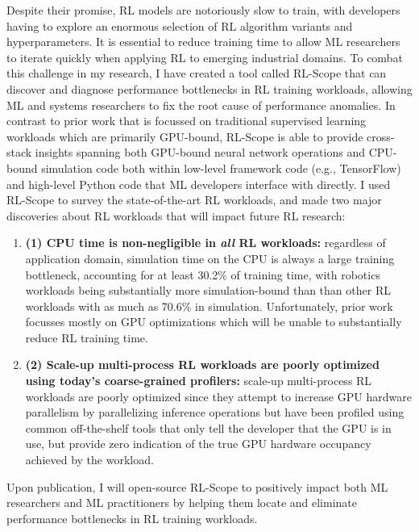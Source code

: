 \documentclass[letterpaper,11pt]{article}
\begin{document}
Despite their promise, RL models are notoriously slow to train, with developers having to explore an enormous selection of RL algorithm variants and hyperparameters.  It is essential to reduce training time to allow ML researchers to iterate quickly when applying RL to emerging industrial domains.  To combat this challenge in my research, I have created a tool called RL-Scope that can discover and diagnose performance bottlenecks in RL training workloads, allowing ML and systems researchers to fix the root cause of performance anomalies.
%
In contrast to prior work that is focussed on traditional supervised learning workloads which are primarily GPU-bound, RL-Scope is able to provide cross-stack insights spanning both GPU-bound neural network operations and CPU-bound simulation code both within low-level framework code (e.g., TensorFlow) and high-level Python code that ML developers interface with directly.
%
I used RL-Scope to survey the state-of-the-art RL workloads, and made two major discoveries about RL workloads that will impact future RL research:
\begin{enumerate}
	\item \textbf{(1) CPU time is non-negligible in \textit{all} RL workloads:} regardless of application domain, simulation time on the CPU is always a large training bottleneck, accounting for at least 30.2\% of training time, with robotics workloads being substantially more simulation-bound than than other RL workloads with as much as 70.6\% in simulation.  Unfortunately, prior work focusses mostly on GPU optimizations which will be unable to substantially reduce RL training time.
%
	\item \textbf{(2) Scale-up multi-process RL workloads are poorly optimized using today's coarse-grained profilers:}
	scale-up multi-process RL workloads are poorly optimized since they attempt to increase GPU hardware parallelism by parallelizing inference operations but have been profiled using common off-the-shelf tools that only tell the developer that the GPU is in use, but provide zero indication of the true GPU hardware occupancy achieved by the workload.
\end{enumerate}
%
Upon publication, I will open-source RL-Scope to positively impact both ML researchers and ML practitioners by helping them locate and eliminate performance bottlenecks in RL training workloads.
\end{document}
